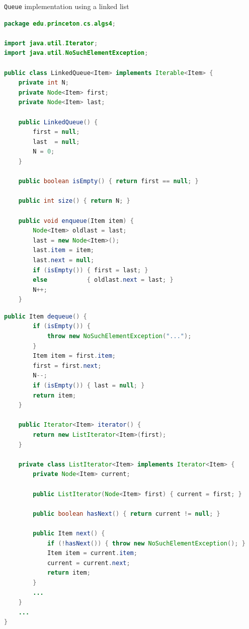 \documentclass[8pt,a4paper,compress]{beamer}
\begin{document}
\begin{frame}[fragile]
\lstinline{Queue} implementation using a linked list
\begin{lstlisting}[language=Java]
package edu.princeton.cs.algs4;

import java.util.Iterator;
import java.util.NoSuchElementException;

public class LinkedQueue<Item> implements Iterable<Item> {
    private int N; 
    private Node<Item> first; 
    private Node<Item> last; 

    public LinkedQueue() {
        first = null;
        last  = null;
        N = 0;
    }

    public boolean isEmpty() { return first == null; }

    public int size() { return N; }

    public void enqueue(Item item) {
        Node<Item> oldlast = last;
        last = new Node<Item>();
        last.item = item;
        last.next = null;
        if (isEmpty()) { first = last; }
        else           { oldlast.next = last; }
        N++;
    }
\end{lstlisting}
\end{frame}

\begin{frame}[fragile]
\begin{lstlisting}[language=Java]
    public Item dequeue() {
        if (isEmpty()) { 
            throw new NoSuchElementException("..."); 
        }
        Item item = first.item;
        first = first.next;
        N--;
        if (isEmpty()) { last = null; }
        return item;
    }

    public Iterator<Item> iterator() { 
        return new ListIterator<Item>(first); 
    }

    private class ListIterator<Item> implements Iterator<Item> {
        private Node<Item> current;

        public ListIterator(Node<Item> first) { current = first; }

        public boolean hasNext() { return current != null; }

        public Item next() {
            if (!hasNext()) { throw new NoSuchElementException(); }
            Item item = current.item;
            current = current.next; 
            return item;
        }
        ...
    }
    ...
}
\end{lstlisting}
\end{frame}
\end{document}
